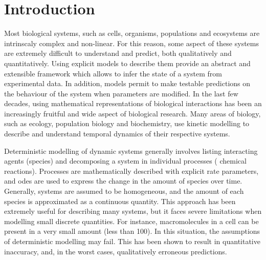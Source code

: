 \section{Introduction} \label{intro}

Most biological systems, such as cells, organisms, populations and ecosystems are intrinscaly complex and non-linear.
For this reason, some aspect of these systems are extremely difficult to understand and predict, both qualitatively and quantitatively\cite{klipp_systems_2013}.
Using explicit models to describe them provide an abstract and extensible framework which allows to infer the state of a system from experimental data.
In addition, models permit to make testable predictions on the behaviour of the system when parameters are modified.
In the last few decades, using mathematical representations of biological interactions has been an increasingly fruitful and wide aspect of biological research.
Many areas of biology, such as ecology, population biology and biochemistry,
use kinetic modelling to describe and understand temporal dynamics of their respective systems.

Deterministic modelling of dynamic systems generally involves listing
interacting agents (species) and decomposing a system in individual processes (\eg{} chemical reactions).
Processes are mathematically described with explicit rate parameters, and \glspl{ode} are used to express the change in the amount of species over time.
Generally, systems are assumed to be homogeneous, and the amount of each species is approximated as a continuous quantity.
This approach has been extremely useful for describing many systems, but it faces severe limitations when modelling small discrete quantities.
For instance, macromolecules in a cell can be present in a very small amount (less than 100).
In this situation, the assumptions of deterministic modelling may fail.
This has been shown to result in quantitative inaccuracy, and, in the worst cases, qualitatively erroneous predictions.


